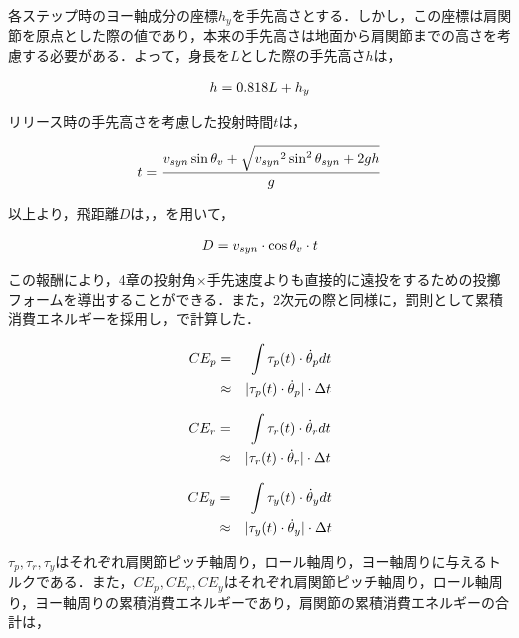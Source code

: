 各ステップ時のヨー軸成分の座標$h_{y}$を手先高さとする．しかし，この座標は肩関節を原点とした際の値であり，本来の手先高さは地面から肩関節までの高さを考慮する必要がある．よって，身長を$L$とした際の手先高さ$h$は，

\begin{eqnarray}
  \equlabel{5.4}
  h = 0.818L + h_{y}
\end{eqnarray}

リリース時の手先高さを考慮した投射時間$t$は，

\begin{eqnarray}
  \equlabel{5.5}
  t = \frac{v_{syn}\sin\theta_{v} + \sqrt{{v_{syn}}^2\sin^2\theta_{syn} + 2gh}}{g}
\end{eqnarray}


以上より，飛距離$D$は，，を用いて，

\begin{eqnarray}
  \equlabel{5.6}
  D = v_{syn} \cdot \cos\theta_{v} \cdot t
\end{eqnarray}

この報酬により，4章の投射角$\times$手先速度よりも直接的に遠投をするための投擲フォームを導出することができる．また，2次元の際と同様に，罰則として累積消費エネルギーを採用し，で計算した．

\begin{eqnarray}
  \equlabel{5.7}
  CE_{p}&=&\int \tau_{p}(t)\cdot\dot{\theta}_{p} dt\\
        &\approx&|\tau_{p}(t)\cdot\dot{\theta}_{p}|\cdot\Delta t
\end{eqnarray}

\begin{eqnarray}
  \equlabel{5.8}
  CE_{r}&=&\int \tau_{r}(t)\cdot\dot{\theta}_{r} dt\\
        &\approx&|\tau_{r}(t)\cdot\dot{\theta}_{r}|\cdot\Delta t
\end{eqnarray}

\begin{eqnarray}
  \equlabel{5.9}
  CE_{y}&=&\int \tau_{y}(t)\cdot\dot{\theta}_{y} dt\\
        &\approx&|\tau_{y}(t)\cdot\dot{\theta}_{y}|\cdot\Delta t
\end{eqnarray}

$\tau_{p},\tau_{r},\tau_{y}$はそれぞれ肩関節ピッチ軸周り，ロール軸周り，ヨー軸周りに与えるトルクである．また，$CE_{p},CE_{r},CE_{y}$はそれぞれ肩関節ピッチ軸周り，ロール軸周り，ヨー軸周りの累積消費エネルギーであり，肩関節の累積消費エネルギーの合計は，

